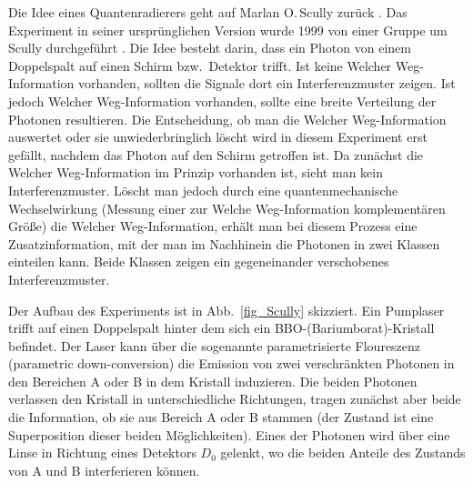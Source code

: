 Die Idee eines Quantenradierers geht auf Marlan O.\,Scully zur\"uck \cite{Scully}.
Das Experiment in seiner urspr\"unglichen Version wurde 1999 
von einer Gruppe um Scully
durchgef\"uhrt \cite{Kim}. Die Idee besteht darin, dass ein Photon von einem Doppelspalt
auf einen Schirm bzw.\ Detektor trifft. Ist keine \glqq Welcher Weg\grqq-Information vorhanden,
sollten die Signale dort ein Interferenzmuster zeigen. Ist jedoch \glqq Welcher Weg\grqq-Information
vorhanden, sollte eine breite Verteilung der Photonen resultieren. Die Entscheidung, ob man
die \glqq Welcher Weg\grqq-Information auswertet oder sie unwiederbringlich l\"oscht wird
in diesem Experiment erst gef\"allt, nachdem das Photon auf den Schirm getroffen ist. 
Da zun\"achst die \glqq Welcher Weg\grqq-Information im Prinzip vorhanden ist, sieht man
kein Interferenzmuster. L\"oscht man jedoch durch eine quantenmechanische
Wechselwirkung (Messung einer zur \glqq Welche Weg\grqq-Information komplement\"aren
Gr\"o\ss e) die \glqq Welcher Weg\grqq-Information,
erh\"alt man bei diesem Prozess eine Zusatzinformation, mit der man im Nachhinein die
Photonen in zwei Klassen einteilen kann. Beide Klassen zeigen ein gegeneinander
verschobenes Interferenzmuster. 

Der Aufbau des Experiments ist in Abb.\ \ref{fig_Scully} skizziert. Ein Pumplaser trifft auf einen
Doppelspalt hinter dem sich ein BBO-(Bariumborat)-Kristall befindet. Der Laser kann
\"uber die sogenannte parametrisierte Floureszenz (parametric down-conversion) die Emission
von zwei verschr\"ankten Photonen in den Bereichen A oder B in dem Kristall induzieren. 
Die beiden Photonen verlassen den Kristall in unterschiedliche Richtungen, tragen zun\"achst
aber beide die Information, ob sie aus Bereich A oder B stammen (der Zustand ist eine
Superposition dieser beiden M\"oglichkeiten). Eines der Photonen wird \"uber eine Linse
in Richtung eines Detektors $D_0$ gelenkt, wo die beiden Anteile des Zustands von A und B interferieren
k\"onnen. 

